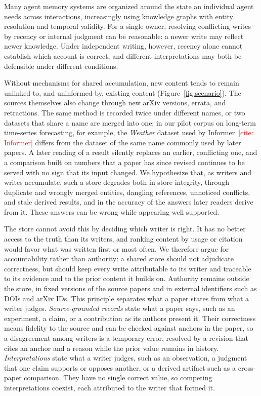 \documentclass[sigconf,review,anonymous]{acmart}
\newcommand{\citeneeded}[1]{\textcolor{red}{[cite: #1]}}
\begin{document}
Many agent memory systems are organized around the state an individual agent
needs across interactions, increasingly using knowledge graphs with entity
resolution and temporal validity. For a single owner, resolving conflicting
writes by recency or internal judgment can be reasonable: a newer write may
reflect newer knowledge. Under independent writing, however, recency alone
cannot establish which account is correct, and different interpretations may
both be defensible under different conditions.

Without mechanisms for shared accumulation, new content tends to remain
unlinked to, and uninformed by, existing content (Figure~\ref{fig:scenario}).
The sources themselves also change through new arXiv versions, errata, and
retractions. The same method is recorded
twice under different names, or two datasets that share a name are merged into
one; in our pilot corpus on long-term time-series forecasting, for example, the
\emph{Weather} dataset used by Informer~\citeneeded{Informer} differs from the
dataset of the same name commonly used by later papers. A later reading of a
result silently replaces an earlier, conflicting one, and a comparison built on
numbers that a paper has since revised continues to be served with no sign that
its input changed. We hypothesize that, as writers and writes accumulate, such
a store degrades both in store integrity, through duplicate and wrongly merged
entities, dangling references, unnoticed conflicts, and stale derived results,
and in the accuracy of the answers later readers derive from it. These answers
can be wrong while appearing well supported.

The store cannot avoid this by deciding which writer is right. It has no better
access to the truth than its writers, and ranking content by usage or citation
would favor what was written first or most often. We therefore argue for
accountability rather than authority: a shared store should not adjudicate
correctness, but should keep every write attributable to its writer and
traceable to its evidence and to the prior content it builds on. Authority
remains outside the store, in fixed versions of the source papers and in
external identifiers such as DOIs and arXiv IDs. This principle separates what
a paper states from what a writer judges. \emph{Source-grounded records} state
what a paper says, such as an experiment, a claim, or a contribution as its
authors present it. Their correctness means fidelity to the source and can be
checked against anchors in the paper, so a disagreement among writers is a
temporary error, resolved by a revision that cites an anchor and a reason while
the prior value remains in history. \emph{Interpretations} state what a writer
judges, such as an observation, a judgment that one claim supports or opposes
another, or a derived artifact such as a cross-paper comparison. They have no
single correct value, so competing interpretations coexist, each attributed to
the writer that formed it.
\end{document}
